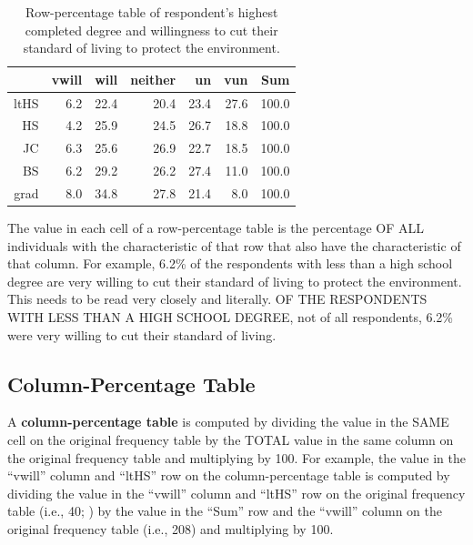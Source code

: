 \documentclass[10pt,openany]{book}\usepackage[]{graphicx}\usepackage[]{color}
\begin{document}
\begin{table}[ht]
\centering
\caption{Row-percentage table of respondent's highest completed degree and willingness to cut their standard of living to protect the environment.} 
\label{tab:EnvRowP}
\begin{tabular}{rrrrrrr}
  \hline
 & vwill & will & neither & un & vun & Sum \\ 
  \hline
ltHS & 6.2 & 22.4 & 20.4 & 23.4 & 27.6 & 100.0 \\ 
  HS & 4.2 & 25.9 & 24.5 & 26.7 & 18.8 & 100.0 \\ 
  JC & 6.3 & 25.6 & 26.9 & 22.7 & 18.5 & 100.0 \\ 
  BS & 6.2 & 29.2 & 26.2 & 27.4 & 11.0 & 100.0 \\ 
  grad & 8.0 & 34.8 & 27.8 & 21.4 & 8.0 & 100.0 \\ 
   \hline
\end{tabular}
\end{table}


The value in each cell of a row-percentage table is the percentage OF ALL individuals with the characteristic of that row that also have the characteristic of that column.  For example, 6.2\% of the respondents with less than a high school degree are very willing to cut their standard of living to protect the environment.  This needs to be read very closely and literally.  OF THE RESPONDENTS WITH LESS THAN A HIGH SCHOOL DEGREE, not of all respondents, 6.2\% were very willing to cut their standard of living.


\vspace{-12pt}

\subsection{Column-Percentage Table}
A \textbf{column-percentage table} is computed by dividing the value in the SAME cell on the original frequency table by the TOTAL value in the same column on the original frequency table and multiplying by 100.  For example, the value in the ``vwill'' column and ``ltHS'' row on the column-percentage table  is computed by dividing the value in the ``vwill'' column and ``ltHS'' row on the original frequency table (i.e., 40; ) by the value in the ``Sum'' row and the ``vwill'' column on the original frequency table (i.e., 208) and multiplying by 100.
\end{document}
